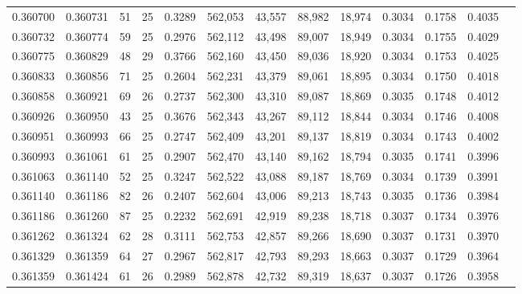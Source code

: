 \begin{tabular}{rrrrrrrrrrrrr}
0.360700 & 0.360731 &    51 &  25 &                                     0.3289 & 562,053 &  43,557 &  88,982 &  18,974 & 0.3034 & 0.1758 & 0.4035 \\
0.360732 & 0.360774 &    59 &  25 &                                     0.2976 & 562,112 &  43,498 &  89,007 &  18,949 & 0.3034 & 0.1755 & 0.4029 \\
0.360775 & 0.360829 &    48 &  29 &                                     0.3766 & 562,160 &  43,450 &  89,036 &  18,920 & 0.3034 & 0.1753 & 0.4025 \\
0.360833 & 0.360856 &    71 &  25 &                                     0.2604 & 562,231 &  43,379 &  89,061 &  18,895 & 0.3034 & 0.1750 & 0.4018 \\
0.360858 & 0.360921 &    69 &  26 &                                     0.2737 & 562,300 &  43,310 &  89,087 &  18,869 & 0.3035 & 0.1748 & 0.4012 \\
0.360926 & 0.360950 &    43 &  25 &                                     0.3676 & 562,343 &  43,267 &  89,112 &  18,844 & 0.3034 & 0.1746 & 0.4008 \\
0.360951 & 0.360993 &    66 &  25 &                                     0.2747 & 562,409 &  43,201 &  89,137 &  18,819 & 0.3034 & 0.1743 & 0.4002 \\
0.360993 & 0.361061 &    61 &  25 &                                     0.2907 & 562,470 &  43,140 &  89,162 &  18,794 & 0.3035 & 0.1741 & 0.3996 \\
0.361063 & 0.361140 &    52 &  25 &                                     0.3247 & 562,522 &  43,088 &  89,187 &  18,769 & 0.3034 & 0.1739 & 0.3991 \\
0.361140 & 0.361186 &    82 &  26 &                                     0.2407 & 562,604 &  43,006 &  89,213 &  18,743 & 0.3035 & 0.1736 & 0.3984 \\
0.361186 & 0.361260 &    87 &  25 &                                     0.2232 & 562,691 &  42,919 &  89,238 &  18,718 & 0.3037 & 0.1734 & 0.3976 \\
0.361262 & 0.361324 &    62 &  28 &                                     0.3111 & 562,753 &  42,857 &  89,266 &  18,690 & 0.3037 & 0.1731 & 0.3970 \\
0.361329 & 0.361359 &    64 &  27 &                                     0.2967 & 562,817 &  42,793 &  89,293 &  18,663 & 0.3037 & 0.1729 & 0.3964 \\
0.361359 & 0.361424 &    61 &  26 &                                     0.2989 & 562,878 &  42,732 &  89,319 &  18,637 & 0.3037 & 0.1726 & 0.3958 \\

\end{tabular}

